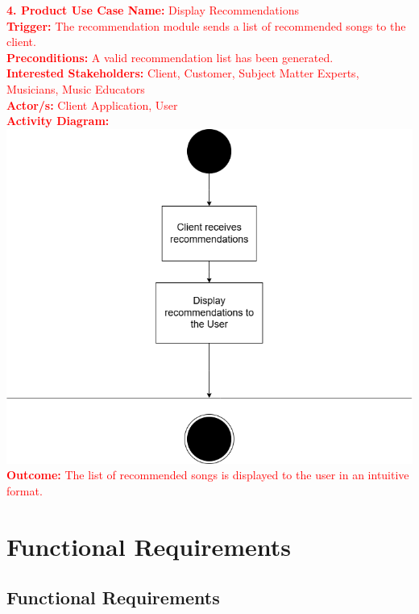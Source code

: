 \documentclass[12pt]{article}
\begin{document}
\vspace{1cm}

\noindent\textcolor{red}{\textbf{4. Product Use Case Name:} Display Recommendations} \\
\textcolor{red}{\textbf{Trigger:} The recommendation module sends a list of recommended songs to the client.} \\
\textcolor{red}{\textbf{Preconditions:} A valid recommendation list has been generated.} \\
\textcolor{red}{\textbf{Interested Stakeholders:} Client, Customer, Subject Matter Experts, Musicians, Music Educators} \\
\textcolor{red}{\textbf{Actor/s:} Client Application, User} \\
\textcolor{red}{\textbf{Activity Diagram:}} \\
\includegraphics[width=\textwidth]{PUC4.drawio.png}
\textcolor{red}{\textbf{Outcome:} The list of recommended songs is displayed to the user in an intuitive format.}

\section{Functional Requirements}
\subsection{Functional Requirements}
\hspace{14pt}
\end{document}
